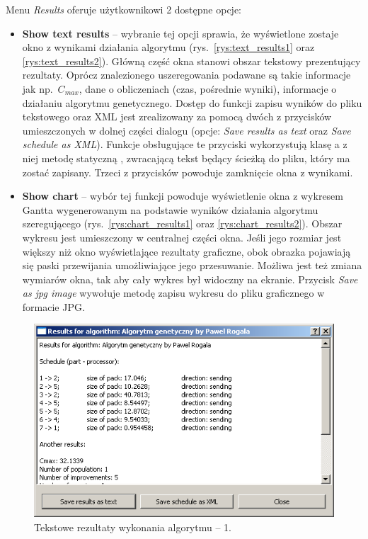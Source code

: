 Menu \emph{Results} oferuje użytkownikowi 2 dostępne opcje:
\begin{itemize}
	\item \textbf{Show text results} -- wybranie tej opcji sprawia, że wyświetlone zostaje okno z wynikami działania algorytmu (rys.~\vref{rys:text_results1} 
	oraz \vref{rys:text_results2}). Główną część okna stanowi obszar tekstowy prezentujący rezultaty. Oprócz znalezionego uszeregowania podawane są 
	takie informacje jak np.~$C_{max}$, dane o obliczeniach (czas, pośrednie wyniki), informacje o działaniu algorytmu 
	genetycznego. Dostęp do funkcji zapisu wyników do pliku tekstowego oraz XML jest zrealizowany za pomocą dwóch z przycisków umieszczonych w dolnej 
	części dialogu (opcje: \emph{Save results as text} oraz \emph{Save schedule as XML}). Funkcje obsługujące te przyciski wykorzystują 
	klasę  a z niej metodę statyczną , zwracającą tekst będący ścieżką do pliku, który ma zostać zapisany. 
	Trzeci z przycisków powoduje zamknięcie okna z wynikami.
	\item \textbf{Show chart} -- wybór tej funkcji powoduje wyświetlenie okna z wykresem Gantta wygenerowanym na podstawie wyników działania algorytmu 
	szeregującego (rys.~\vref{rys:chart_results1} oraz \vref{rys:chart_results2}). Obszar wykresu jest umieszczony w centralnej części okna. 
	Jeśli jego rozmiar jest większy niż okno wyświetlające rezultaty graficzne, obok obrazka pojawiają się paski przewijania umożliwiające 
	jego przesuwanie. Możliwa jest też zmiana wymiarów okna, tak aby cały wykres był widoczny na ekranie. Przycisk \emph{Save as jpg image} 
	wywołuje metodę zapisu wykresu do pliku graficznego w formacie JPG. 
\end{itemize}

\begin{figure}[htp]
\centering \includegraphics[scale=1]{figures/screens/text_results1.png}
\caption{Tekstowe rezultaty wykonania algorytmu -- 1.}\label{rys:text_results1}
\end{figure}

